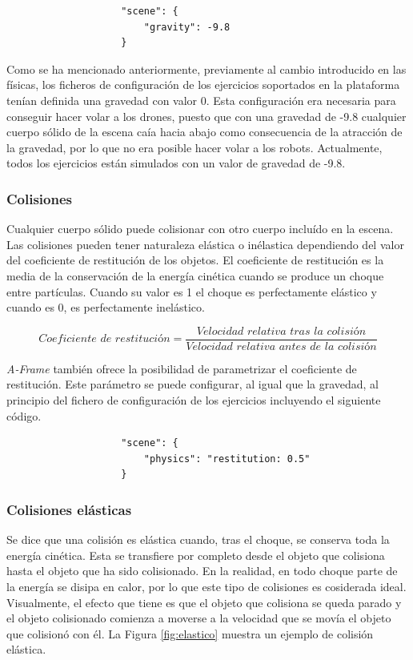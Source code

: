 \begin{verbatim}
                    "scene": {
                        "gravity": -9.8
                    }
\end{verbatim}

Como se ha mencionado anteriormente, previamente al cambio introducido en las físicas, los ficheros de configuración de los ejercicios soportados en la plataforma tenían definida una gravedad con valor 0. Esta configuración era necesaria para conseguir hacer volar a los drones, puesto que con una gravedad de -9.8 cualquier cuerpo sólido de la escena caía hacia abajo como consecuencia de la atracción de la gravedad, por lo que no era posible hacer volar a los robots. Actualmente, todos los ejercicios están simulados con un valor de gravedad de -9.8.  \newline

\subsubsection{Colisiones}
Cualquier cuerpo sólido puede colisionar con otro cuerpo incluído en la escena. Las colisiones pueden tener naturaleza elástica o inélastica dependiendo del valor del coeficiente de restitución de los objetos. El coeficiente de restitución es la media de la conservación de la energía cinética cuando se produce un choque entre partículas. Cuando su valor es 1 el choque es perfectamente elástico y cuando es 0, es perfectamente inelástico. 

\begin{equation}
   Coeficiente \,\, de \,\,restitución = \frac{Velocidad \,\, relativa \,\, tras \,\, la \,\, colisión}{Velocidad \,\, relativa \,\, antes \,\, de \,\, la \,\, colisión}
\end{equation} \newline

\textit{A-Frame} también ofrece la posibilidad de parametrizar el coeficiente de restitución. Este parámetro se puede configurar, al igual que la gravedad, al principio del fichero de configuración de los ejercicios incluyendo el siguiente código.

\begin{verbatim}
                    "scene": {
                        "physics": "restitution: 0.5"
                    }
\end{verbatim}

\subsubsection{Colisiones elásticas}
Se dice que una colisión es elástica cuando, tras el choque, se conserva toda la energía cinética. Esta se transfiere por completo desde el objeto que colisiona hasta el objeto que ha sido colisionado. En la realidad, en todo choque parte de la energía se disipa en calor, por lo que este tipo de colisiones es cosiderada ideal. Visualmente, el efecto que tiene es que el objeto que colisiona se queda parado y el objeto colisionado comienza a moverse a la velocidad que se movía el objeto que colisionó con él. La Figura \ref{fig:elastico} muestra un ejemplo de colisión elástica.

